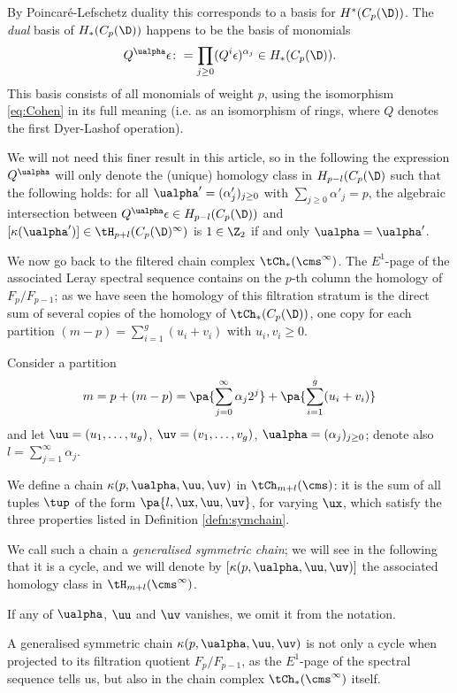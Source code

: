 By Poincaré-Lefschetz duality this corresponds to a basis for $H^*(C_p(\D))$.
The \emph{dual} basis of $H_*(C_p(\D))$
happens to be the basis of monomials
\[
Q^{\ualpha}\epsilon\colon =\prod_{j\geq 0}(Q^i\epsilon)^{\alpha_j}\in H_*(C_p(\D)).
\]
This basis consists of all monomials
of weight $p$, using
the isomorphism \eqref{eq:Cohen} in its full meaning (i.e. as an isomorphism of rings,
where $Q$ denotes the first Dyer-Lashof operation).

We will not need this finer result in this article, so in the following the expression
$Q^{\ualpha}$ will only denote
the (unique) homology class in $H_{p-l}(C_p(\D)$ such that the following holds:
for all $\ualpha'=(\alpha'_j)_{j\geq 0}$ with $\sum_{j\geq 0}\alpha'_j=p$, the
algebraic intersection between $Q^{\ualpha}\epsilon\in H_{p-l}(C_p(\D))$
and $[\kappa(\ualpha')]\in\tH_{p+l}(C_p(\D)^{\infty})$
is $1\in\Z_2$ if and only $\ualpha=\ualpha'$.

We now go back to the filtered chain complex $\tCh_*(\cms^{\infty})$.
The $E^1$-page of the associated Leray spectral sequence contains on the $p$-th column
the homology of $F_p/F_{p-1}$; as we have seen the homology of this filtration stratum is
the direct sum of several copies of the homology of $\tCh_*(C_p(\D))$, one copy for each
partition $(m-p)=\sum_{i=1}^g (u_i+v_i)$ with $u_i,v_i\geq 0$.

\begin{defn}
\label{defn:gensymchain}
Consider a partition
\[
 m=p+(m-p)=\pa{\sum_{j=0}^{\infty}\alpha_j2^j}+\pa{\sum_{i=1}^g(u_i+v_i)}
\]
and let $\uu=(u_1,\dots,u_g)$, $\uv=(v_1,\dots, v_g)$, $\ualpha=(\alpha_j)_{j\geq 0}$; denote also $l=\sum_{j=1}^{\infty}\alpha_j$.

We define a chain $\kappa(p,\ualpha,\uu,\uv)$ in
$\tCh_{m+l}(\cms)$: it
is the sum of all tuples $\tup$ of the form $\pa{l,\ux,\uu,\uv}$, for varying $\ux$,
which satisfy the three properties listed in Definition \ref{defn:symchain}.

We call such a chain a
\emph{generalised symmetric chain}; we will see in the following that it is a cycle, and we will
denote by $[\kappa(p,\ualpha,\uu,\uv)]$ the associated homology class in $\tH_{m+l}(\cms^{\infty})$.

If any of $\ualpha$, $\uu$ and $\uv$ vanishes, we omit it from the notation.
\end{defn}

A generalised symmetric chain $\kappa(p,\ualpha,\uu,\uv)$
is not only
a cycle when projected to its filtration quotient $F_p/F_{p-1}$, as the $E^1$-page
of the spectral sequence tells us, but also
in the chain complex $\tCh_*(\cms^{\infty})$ itself.

